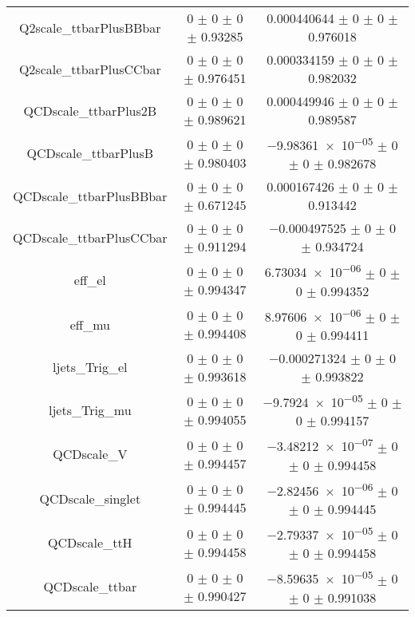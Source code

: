 \begin{table}
\begin{tabular}{ccc}
Q2scale\_ttbarPlusBBbar & \num{0} $\pm$ \num{0} $\pm$ \num{0} $\pm$ \num{0.93285} & \num{0.000440644} $\pm$ \num{0} $\pm$ \num{0} $\pm$ \num{0.976018}\\
Q2scale\_ttbarPlusCCbar & \num{0} $\pm$ \num{0} $\pm$ \num{0} $\pm$ \num{0.976451} & \num{0.000334159} $\pm$ \num{0} $\pm$ \num{0} $\pm$ \num{0.982032}\\
QCDscale\_ttbarPlus2B & \num{0} $\pm$ \num{0} $\pm$ \num{0} $\pm$ \num{0.989621} & \num{0.000449946} $\pm$ \num{0} $\pm$ \num{0} $\pm$ \num{0.989587}\\
QCDscale\_ttbarPlusB & \num{0} $\pm$ \num{0} $\pm$ \num{0} $\pm$ \num{0.980403} & \num{-9.98361e-05} $\pm$ \num{0} $\pm$ \num{0} $\pm$ \num{0.982678}\\
QCDscale\_ttbarPlusBBbar & \num{0} $\pm$ \num{0} $\pm$ \num{0} $\pm$ \num{0.671245} & \num{0.000167426} $\pm$ \num{0} $\pm$ \num{0} $\pm$ \num{0.913442}\\
QCDscale\_ttbarPlusCCbar & \num{0} $\pm$ \num{0} $\pm$ \num{0} $\pm$ \num{0.911294} & \num{-0.000497525} $\pm$ \num{0} $\pm$ \num{0} $\pm$ \num{0.934724}\\
eff\_el & \num{0} $\pm$ \num{0} $\pm$ \num{0} $\pm$ \num{0.994347} & \num{6.73034e-06} $\pm$ \num{0} $\pm$ \num{0} $\pm$ \num{0.994352}\\
eff\_mu & \num{0} $\pm$ \num{0} $\pm$ \num{0} $\pm$ \num{0.994408} & \num{8.97606e-06} $\pm$ \num{0} $\pm$ \num{0} $\pm$ \num{0.994411}\\
ljets\_Trig\_el & \num{0} $\pm$ \num{0} $\pm$ \num{0} $\pm$ \num{0.993618} & \num{-0.000271324} $\pm$ \num{0} $\pm$ \num{0} $\pm$ \num{0.993822}\\
ljets\_Trig\_mu & \num{0} $\pm$ \num{0} $\pm$ \num{0} $\pm$ \num{0.994055} & \num{-9.7924e-05} $\pm$ \num{0} $\pm$ \num{0} $\pm$ \num{0.994157}\\
QCDscale\_V & \num{0} $\pm$ \num{0} $\pm$ \num{0} $\pm$ \num{0.994457} & \num{-3.48212e-07} $\pm$ \num{0} $\pm$ \num{0} $\pm$ \num{0.994458}\\
QCDscale\_singlet & \num{0} $\pm$ \num{0} $\pm$ \num{0} $\pm$ \num{0.994445} & \num{-2.82456e-06} $\pm$ \num{0} $\pm$ \num{0} $\pm$ \num{0.994445}\\
QCDscale\_ttH & \num{0} $\pm$ \num{0} $\pm$ \num{0} $\pm$ \num{0.994458} & \num{-2.79337e-05} $\pm$ \num{0} $\pm$ \num{0} $\pm$ \num{0.994458}\\
QCDscale\_ttbar & \num{0} $\pm$ \num{0} $\pm$ \num{0} $\pm$ \num{0.990427} & \num{-8.59635e-05} $\pm$ \num{0} $\pm$ \num{0} $\pm$ \num{0.991038}\\

\end{tabular}
\end{table}
